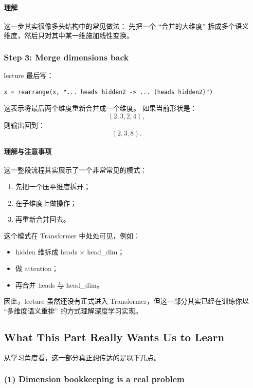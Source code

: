 \documentclass[a4paper,UTF8]{article}
\numberwithin{equation}{section}
\begin{document}
\paragraph{理解}
这一步其实很像多头结构中的常见做法：  
先把一个 ``合并的大维度'' 拆成多个语义维度，然后只对其中某一维施加线性变换。

\subsubsection{Step 3: Merge dimensions back}

lecture 最后写：
\begin{verbatim}
x = rearrange(x, "... heads hidden2 -> ... (heads hidden2)")
\end{verbatim}

这表示将最后两个维度重新合并成一个维度。  
如果当前形状是：
\[
(2,3,2,4),
\]
则输出回到：
\[
(2,3,8).
\]

\paragraph{理解与注意事项}
这一整段流程其实展示了一个非常常见的模式：
\begin{enumerate}
    \item 先把一个压平维度拆开；
    \item 在子维度上做操作；
    \item 再重新合并回去。
\end{enumerate}

这个模式在 Transformer 中处处可见，例如：
\begin{itemize}
    \item hidden 维拆成 heads $\times$ head\_dim；
    \item 做 attention；
    \item 再合并 heads 与 head\_dim。
\end{itemize}

因此，lecture 虽然还没有正式进入 Transformer，但这一部分其实已经在训练你以 ``多维度语义重排'' 的方式理解深度学习实现。

\subsection{What This Part Really Wants Us to Learn}

从学习角度看，这一部分真正想传达的是以下几点。

\subsubsection{(1) Dimension bookkeeping is a real problem}
\end{document}
